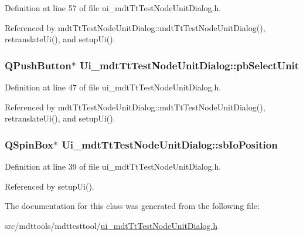 Definition at line 57 of file ui\-\_\-mdt\-Tt\-Test\-Node\-Unit\-Dialog.\-h.



Referenced by mdt\-Tt\-Test\-Node\-Unit\-Dialog\-::mdt\-Tt\-Test\-Node\-Unit\-Dialog(), retranslate\-Ui(), and setup\-Ui().

\hypertarget{class_ui__mdt_tt_test_node_unit_dialog_a1dbfb594a879051d7bc202af995ad68c}{
\subsubsection[{pb\-Select\-Unit}]{\setlength{\rightskip}{0pt plus 5cm}Q\-Push\-Button$\ast$ Ui\-\_\-mdt\-Tt\-Test\-Node\-Unit\-Dialog\-::pb\-Select\-Unit}}\label{class_ui__mdt_tt_test_node_unit_dialog_a1dbfb594a879051d7bc202af995ad68c}


Definition at line 47 of file ui\-\_\-mdt\-Tt\-Test\-Node\-Unit\-Dialog.\-h.



Referenced by mdt\-Tt\-Test\-Node\-Unit\-Dialog\-::mdt\-Tt\-Test\-Node\-Unit\-Dialog(), retranslate\-Ui(), and setup\-Ui().

\hypertarget{class_ui__mdt_tt_test_node_unit_dialog_ac9c8fc92eea1cbd5053a6327af4cf36c}{
\subsubsection[{sb\-Io\-Position}]{\setlength{\rightskip}{0pt plus 5cm}Q\-Spin\-Box$\ast$ Ui\-\_\-mdt\-Tt\-Test\-Node\-Unit\-Dialog\-::sb\-Io\-Position}}\label{class_ui__mdt_tt_test_node_unit_dialog_ac9c8fc92eea1cbd5053a6327af4cf36c}


Definition at line 39 of file ui\-\_\-mdt\-Tt\-Test\-Node\-Unit\-Dialog.\-h.



Referenced by setup\-Ui().



The documentation for this class was generated from the following file\-:\begin{DoxyCompactItemize}
\item 
src/mdttools/mdttesttool/\hyperlink{ui__mdt_tt_test_node_unit_dialog_8h}{ui\-\_\-mdt\-Tt\-Test\-Node\-Unit\-Dialog.\-h}\end{DoxyCompactItemize}
